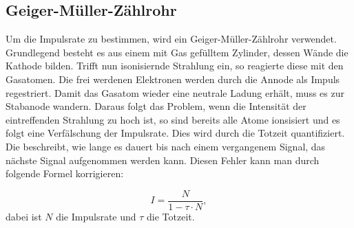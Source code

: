 \subsection{Geiger-Müller-Zählrohr}
Um die Impulsrate zu bestimmen, wird ein Geiger-Müller-Zählrohr verwendet.
Grundlegend besteht es aus einem mit Gas gefülltem Zylinder, dessen Wände die Kathode bilden.
Trifft nun isonisiernde Strahlung ein, so reagierte diese mit den Gasatomen. 
Die frei werdenen Elektronen werden durch die Annode als Impuls regestriert.
Damit das Gasatom wieder eine neutrale Ladung erhält, muss es zur Stabanode wandern.
Daraus folgt das Problem, wenn die Intensität der eintreffenden Strahlung zu hoch ist,
so sind bereits alle Atome ionsisiert und es folgt eine Verfälschung der Impulsrate.
Dies wird durch die Totzeit quantifiziert. Die beschreibt, wie lange es dauert bis
nach einem vergangenem Signal, das nächste Signal aufgenommen werden kann.
Diesen Fehler kann man durch folgende Formel korrigieren:

\begin{equation}
    I=\frac{N}{1-\tau \cdot N},
    \label{eqn:totzeit}
\end{equation}
dabei ist $N$ die Impulsrate und $\tau$ die Totzeit.